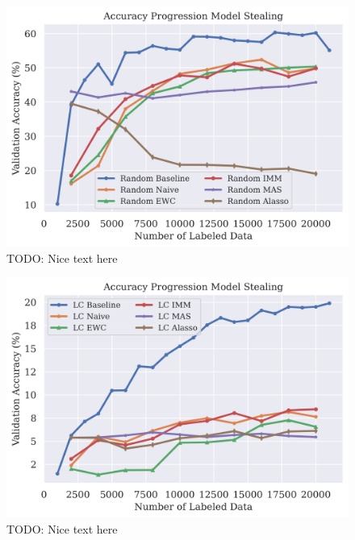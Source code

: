 \begin{figure}[h]
    \centering
    \includegraphics[width=0.8\linewidth]{images/results_CALMS/cifar_label_random.png}
    \caption[Accuracy Comparison for Model Stealing on CIFAR10 using the top1-label and the Active Learning strategy Random]{TODO: Nice text here}
    \label{fig:CALMSCIFAR10LabelRandom}
\end{figure}

\begin{figure}[h]
    \centering
    \includegraphics[width=0.8\linewidth]{images/results_CALMS/cifar100_label_lc.png}
    \caption[Accuracy Comparison for Model Stealing on CIFAR10 using the top1-label and the Active Learning strategy LC]{TODO: Nice text here}
    \label{fig:CALMSCIFAR10LabelLC}
\end{figure}

